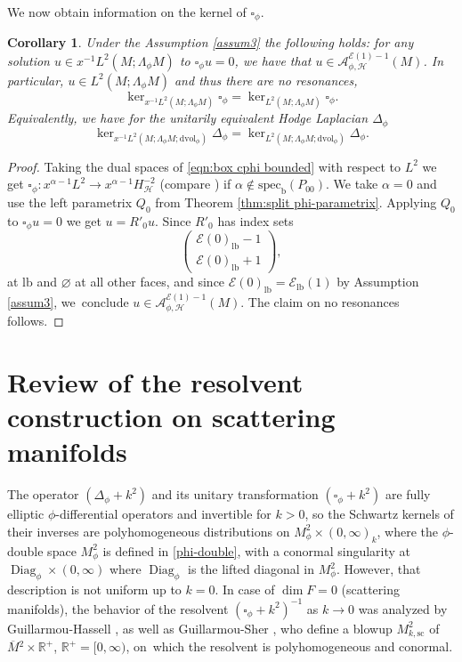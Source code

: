\documentclass[JEP,XML,SOM,Unicode,NoFloatCountersInSection,published]{cedram}
\theoremstyle{plain}
\newtheorem{Cor}[Th]{Corollary}
\theoremstyle{definition}
\newcommand{\R}{{\mathbb{R}}}
\newcommand\calA{{\mathcal A}}
\newcommand\calE{{\mathcal E}}
\newcommand{\lf}{{\mathrm{lb}}}
\newcommand{\bb}{{\mathrm{b}}}
\newcommand{\ssc}{{\mathrm{sc}}}
\newcommand{\dvol}{\mathrm{dvol}}
\newcommand{\specb}{\mathrm{spec}_\bb}
\DeclareMathOperator{\Diag}{Diag}
\newcommand{\Hsplit}{H_{\mathscr{H}}}
\newcommand{\Mbar}{{\overline{M}}}\let\M\Mbar
\begin{document}
We now obtain information on the kernel of $\square_\phi$.
\begin{Cor}
\label{cor:kernel}
Under the Assumption \ref{assum3} the following holds:
for any solution $u\in x^{-1}L^2(M;\Lambda_\phi M)$ to $\square_\phi u=0$, we have that
$u\in \calA_{\phi,\mathscr{H}}^{\calE(1)-1}(M)$. In particular, $u\in L^2(M;\Lambda_\phi M)$ and thus
there are no resonances, \ie\vspace*{-3pt}
\[
\ker_{x^{-1}L^2(M;\Lambda_\phi M)} \square_\phi = \ker_{L^2(M;\Lambda_\phi M)} \square_\phi.
\]
Equivalently, we have for the unitarily equivalent Hodge Laplacian $\Delta_{\phi}$\vspace*{-3pt}
\[
\ker_{x^{-1}L^2(M;\Lambda_\phi M; \dvol_\phi)} \Delta_{\phi} = \ker_{L^2(M; \Lambda_\phi M;\dvol_\phi)} \Delta_{\phi}.
\]
\end{Cor}
\begin{proof}
Taking the dual spaces of \eqref{eqn:box cphi bounded} with respect to $L^2$ we get
$\square_\phi: x^{\alpha-1}L^2 \to x^{\alpha-1} \Hsplit^{-2}$
(compare \cite[Th.\,13]{grieser-para}) if $\alpha\not\in \specb(P_{00})$. We take $\alpha=0$ and use the left parametrix $Q_0$ from Theorem \ref{thm:split phi-parametrix}. Applying $Q_0$ to $\square_\phi u=0$ we get $u=R'_0u$. Since
$R'_0$ has index sets
\[
\begin{pmatrix}
\calE(0)_\lf-1 \\ \calE(0)_\lf+1
\end{pmatrix},
\]
at $\lf$ and $\varnothing$ at all other faces, and since $\calE(0)_\lf=\calE_\lf(1)$ by Assumption \ref{assum3},
we~conclude $u\in \calA_{\phi,\mathscr{H}}^{\calE(1)-1}(M)$. The claim on no resonances follows.
\end{proof}

\section{Review of the resolvent construction on scattering manifolds}
\label{section 3}
The operator $(\Delta_{\phi} + k^2)$ and its unitary transformation
$(\square_{\phi} + k^2)$ are fully elliptic $\phi$\nobreakdash-differential operators and invertible for $k>0$, so the Schwartz kernels of their inverses are
polyhomogeneous distributions on $M^2_\phi \times (0,\infty)_k$, where
the $\phi$-double space $M_\phi^2$ is defined in \eqref{phi-double}, with a conormal singularity at $\Diag_\phi\times(0,\infty)$ where $\Diag_\phi$ is the lifted diagonal in $M^2_\phi$. However, that description
is not uniform up to $k=0$. In case of $\dim F = 0$ (scattering manifolds), the behavior of the resolvent $(\square_{\phi} + k^2)^{-1}$
as $k\to 0$ was analyzed by Guillarmou-Hassell \cite{guillarmou2008resolvent, guillarmou2009resolvent},
as well as Guillarmou-Sher \cite{guillarmou2014low}, who define
a blowup $M^2_{k, \ssc}$ of $\Mbar{}^2 \times \R^+$, $\R^+=[0,\infty)$,
on~which the resolvent is polyhomogeneous and conormal.
\end{document}
